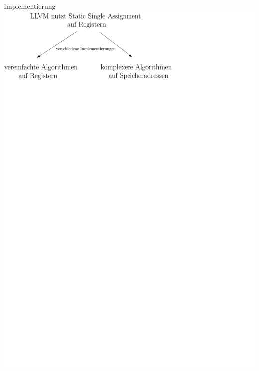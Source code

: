 \documentclass[ucs,9pt]{beamer}
\begin{document}
\begin{frame}{Implementierung}
\includegraphics[scale=0.8]{bilder/ssa}
\end{frame}
\end{document}
